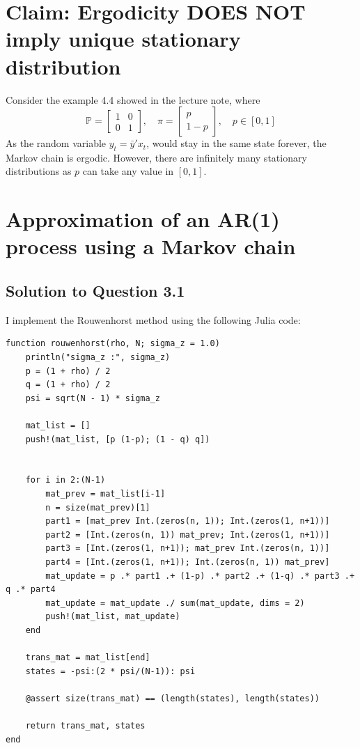 \documentclass[11pt]{article}
\theoremstyle{definition}
\theoremstyle{boldtitle} %
\numberwithin{equation}{section}
\numberwithin{figure}{section}
\numberwithin{table}{section}
\begin{document}
\section*{Claim: Ergodicity DOES NOT imply unique stationary distribution}
Consider the example 4.4 showed in the lecture note,
where 
\[
\mathbb{P} = \left[
\begin{matrix}
    1 & 0 \\ 0 & 1
\end{matrix}
\right], \quad  \pi = \left[
\begin{matrix}
    p \\ 1-p
\end{matrix}
\right], \quad p \in [0,1]
\]
As the random variable $y_t = \bar{y}' x_t$, would stay in the same state forever, the Markov chain is ergodic.
However, there are infinitely many stationary distributions as $p$ can take any value in $[0,1]$.

\section*{Approximation of an AR(1) process using a Markov chain}
\subsection*{Solution to Question 3.1}
I implement the Rouwenhorst method using the following Julia code:
\begin{lstlisting}
function rouwenhorst(rho, N; sigma_z = 1.0)
    println("sigma_z :", sigma_z)
    p = (1 + rho) / 2
    q = (1 + rho) / 2
    psi = sqrt(N - 1) * sigma_z

    mat_list = [] 
    push!(mat_list, [p (1-p); (1 - q) q])


    for i in 2:(N-1)
        mat_prev = mat_list[i-1]
        n = size(mat_prev)[1]
        part1 = [mat_prev Int.(zeros(n, 1)); Int.(zeros(1, n+1))]
        part2 = [Int.(zeros(n, 1)) mat_prev; Int.(zeros(1, n+1))]
        part3 = [Int.(zeros(1, n+1)); mat_prev Int.(zeros(n, 1))]
        part4 = [Int.(zeros(1, n+1)); Int.(zeros(n, 1)) mat_prev]
        mat_update = p .* part1 .+ (1-p) .* part2 .+ (1-q) .* part3 .+ q .* part4
        mat_update = mat_update ./ sum(mat_update, dims = 2)
        push!(mat_list, mat_update)
    end

    trans_mat = mat_list[end]
    states = -psi:(2 * psi/(N-1)): psi

    @assert size(trans_mat) == (length(states), length(states))
    
    return trans_mat, states 
end
\end{lstlisting}
\end{document}
